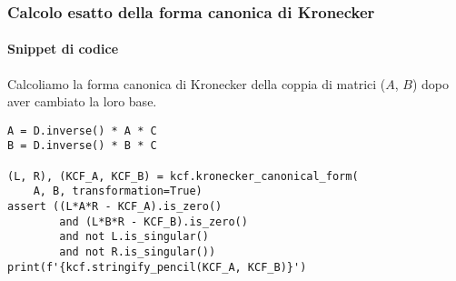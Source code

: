 \begin{frame}[fragile]
	\frametitle{Calcolo esatto della forma canonica di Kronecker}
	\framesubtitle{Snippet di codice}
	Calcoliamo la forma canonica di Kronecker della coppia di matrici ($A$, $B$) dopo aver
	cambiato la loro base.
	\begin{verbatim}
A = D.inverse() * A * C
B = D.inverse() * B * C

(L, R), (KCF_A, KCF_B) = kcf.kronecker_canonical_form(
	A, B, transformation=True)
assert ((L*A*R - KCF_A).is_zero()
		and (L*B*R - KCF_B).is_zero()
		and not L.is_singular()
		and not R.is_singular())
print(f'{kcf.stringify_pencil(KCF_A, KCF_B)}')
\end{verbatim}
\end{frame}